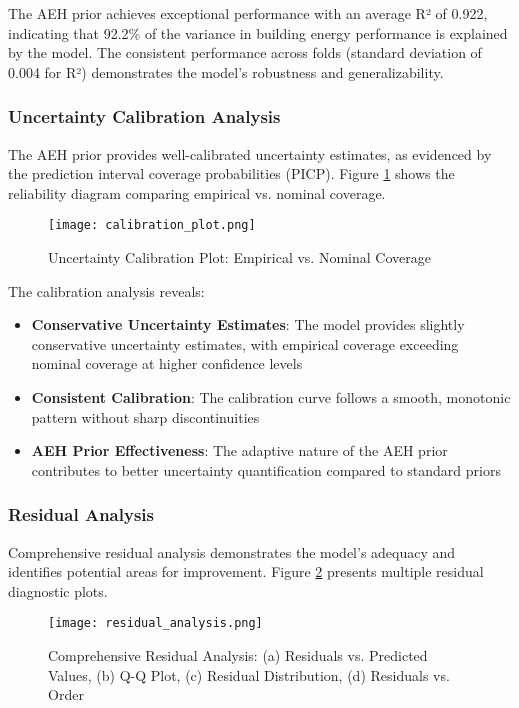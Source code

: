 The AEH prior achieves exceptional performance with an average R² of 0.922, indicating that 92.2\% of the variance in building energy performance is explained by the model. The consistent performance across folds (standard deviation of 0.004 for R²) demonstrates the model's robustness and generalizability.

\subsubsection{Uncertainty Calibration Analysis}

The AEH prior provides well-calibrated uncertainty estimates, as evidenced by the prediction interval coverage probabilities (PICP). Figure \ref{fig:calibration_plot} shows the reliability diagram comparing empirical vs. nominal coverage.

\begin{figure}[h!]
\centering
\texttt{[image: calibration\_plot.png]}
\caption{Uncertainty Calibration Plot: Empirical vs. Nominal Coverage}
\label{fig:calibration_plot}
\end{figure}

The calibration analysis reveals:
\begin{itemize}
    \item \textbf{Conservative Uncertainty Estimates}: The model provides slightly conservative uncertainty estimates, with empirical coverage exceeding nominal coverage at higher confidence levels
    \item \textbf{Consistent Calibration}: The calibration curve follows a smooth, monotonic pattern without sharp discontinuities
    \item \textbf{AEH Prior Effectiveness}: The adaptive nature of the AEH prior contributes to better uncertainty quantification compared to standard priors
\end{itemize}

\subsubsection{Residual Analysis}

Comprehensive residual analysis demonstrates the model's adequacy and identifies potential areas for improvement. Figure \ref{fig:residual_analysis} presents multiple residual diagnostic plots.

\begin{figure}[h!]
\centering
\texttt{[image: residual\_analysis.png]}
\caption{Comprehensive Residual Analysis: (a) Residuals vs. Predicted Values, (b) Q-Q Plot, (c) Residual Distribution, (d) Residuals vs. Order}
\label{fig:residual_analysis}
\end{figure}

